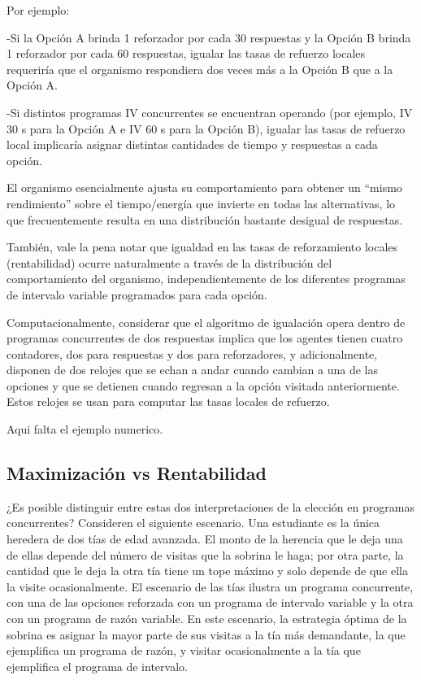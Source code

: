 \documentclass[
  a4paper,
  DIV=11,
  numbers=noendperiod]{scrreprt}
\begin{document}
Por ejemplo:

-Si la Opción A brinda 1 reforzador por cada 30 respuestas y la Opción B
brinda 1 reforzador por cada 60 respuestas, igualar las tasas de
refuerzo locales requeriría que el organismo respondiera dos veces más a
la Opción B que a la Opción A.

-Si distintos programas IV concurrentes se encuentran operando (por
ejemplo, IV 30 s para la Opción A e IV 60 s para la Opción B), igualar
las tasas de refuerzo local implicaría asignar distintas cantidades de
tiempo y respuestas a cada opción.

El organismo esencialmente ajusta su comportamiento para obtener un
``mismo rendimiento'' sobre el tiempo/energía que invierte en todas las
alternativas, lo que frecuentemente resulta en una distribución bastante
desigual de respuestas.

También, vale la pena notar que igualdad en las tasas de reforzamiento
locales (rentabilidad) ocurre naturalmente a través de la distribución
del comportamiento del organismo, independientemente de los diferentes
programas de intervalo variable programados para cada opción.

Computacionalmente, considerar que el algoritmo de igualación opera
dentro de programas concurrentes de dos respuestas implica que los
agentes tienen cuatro contadores, dos para respuestas y dos para
reforzadores, y adicionalmente, disponen de dos relojes que se echan a
andar cuando cambian a una de las opciones y que se detienen cuando
regresan a la opción visitada anteriormente. Estos relojes se usan para
computar las tasas locales de refuerzo.

Aqui falta el ejemplo numerico.

\subsection{Maximización vs
Rentabilidad}\label{maximizaciuxf3n-vs-rentabilidad}

¿Es posible distinguir entre estas dos interpretaciones de la elección
en programas concurrentes? Consideren el siguiente escenario. Una
estudiante es la única heredera de dos tías de edad avanzada. El monto
de la herencia que le deja una de ellas depende del número de visitas
que la sobrina le haga; por otra parte, la cantidad que le deja la otra
tía tiene un tope máximo y solo depende de que ella la visite
ocasionalmente. El escenario de las tías ilustra un programa
concurrente, con una de las opciones reforzada con un programa de
intervalo variable y la otra con un programa de razón variable. En este
escenario, la estrategia óptima de la sobrina es asignar la mayor parte
de sus visitas a la tía más demandante, la que ejemplifica un programa
de razón, y visitar ocasionalmente a la tía que ejemplifica el programa
de intervalo.
\end{document}
